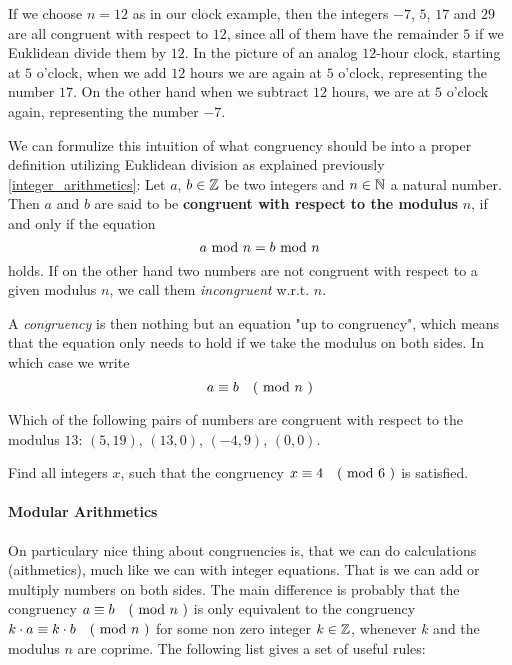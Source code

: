\begin{example}
If we choose $n=12$ as in our clock example, then the integers $-7$, $5$, $17$ and $29$ are all congruent with respect to $12$, since all of them have the remainder $5$ if we Euklidean divide them by $12$. In the picture of an analog $12$-hour clock, starting at $5$ o'clock, when we add $12$ hours we are again at $5$ o'clock, representing the number $17$. On the other hand when we subtract $12$ hours, we are at $5$ o'clock again, representing the number $-7$. 
\end{example}
We can formulize this intuition of what congruency should be into a proper definition utilizing Euklidean division as explained previously \ref{integer_arithmetics}: Let $ a $, $ b \in \mathbb{Z} $ be two integers and $ n \in \mathbb{N} $ a natural number.
Then $ a $ and $ b $ are said to be \textbf{congruent with respect to the modulus} $ n $, if and only if the equation
\begin{equation}
a \text{ mod } n = b \text{ mod } n
\end{equation}
holds. If on the other hand two numbers are not congruent with respect to a given modulus $n$, we call them \textit{incongruent} w.r.t. $n$. 

A \textit{congruency} is then nothing but an equation "up to congruency", which means that the equation only needs to hold if we take the modulus on both sides. In which case we write 
\begin{equation}
a \equiv b \quad \text{( mod } n \text{ )} 
\end{equation}
\begin{exercise}
Which of the following pairs of numbers are congruent with respect to the modulus $13$: 
$(5,19)$, $(13,0)$, $(-4,9)$, $(0,0)$.
\end{exercise}
\begin{exercise}
Find all integers $x$, such that the congruency $x \equiv 4 \quad \text{( mod } 6 \text{ )}$ is satisfied.
\end{exercise}
\paragraph{Modular Arithmetics}
On particulary nice thing about congruencies is, that we can do calculations (aithmetics), much like we can with integer equations. That is we can add or multiply numbers on both sides. The main difference is probably that the congruency $a \equiv b \quad \text{( mod } n \text{ )}$ is only equivalent to the congruency $k\cdot a \equiv k\cdot b \quad \text{( mod } n \text{ )}$ for some non zero integer $k\in \mathbb{Z}$, whenever $k$ and the modulus $n$ are coprime. The following list gives a set of useful rules:

